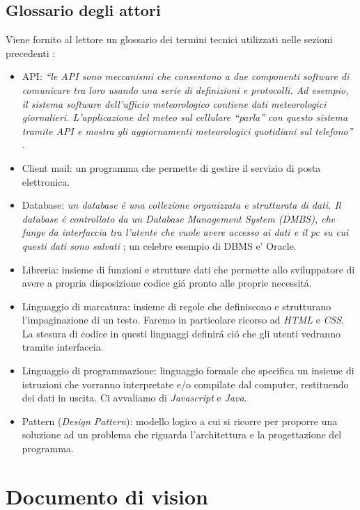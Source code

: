 \documentclass[12pt]{article}
\begin{document}
\subsection{Glossario degli attori}

Viene fornito al lettore un glossario dei termini tecnici utilizzati nelle sezioni precedenti \cite{elicitation_tools}:
\begin{itemize}
    \item API: \textit{``le API sono meccanismi che consentono a due componenti software di comunicare tra loro usando una serie di definizioni e protocolli. Ad esempio, il sistema software dell'ufficio meteorologico contiene dati meteorologici giornalieri. L'applicazione del meteo sul cellulare ``parla'' con questo sistema tramite API e mostra gli aggiornamenti meteorologici quotidiani sul telefono''} \cite{bworld}.
    \item Client mail: un programma che permette di gestire il servizio di posta elettronica.
    \item Database: \textit{un database \'e una collezione organizzata e strutturata di dati. Il database \'e controllato da un Database Management System (DMBS), che funge da interfaccia tra l'utente che vuole avere accesso ai dati e il pc su cui questi dati sono salvati} \cite{database}; un celebre esempio di DBMS e' Oracle. 
    \item Libreria: insieme di funzioni e strutture dati che permette allo sviluppatore di avere a propria disposizione codice gi\'a pronto alle proprie necessit\'a.
    \item Linguaggio di marcatura: insieme di regole che definiscono e strutturano l'impaginazione di un testo. Faremo in particolare ricorso ad \textit{HTML} e \textit{CSS}. La stesura di codice in questi linguaggi definir\'a ci\'o che gli utenti vedranno tramite interfaccia.
    \item Linguaggio di programmazione: linguaggio formale che specifica un insieme di istruzioni che vorranno interpretate e/o compilate dal computer, restituendo dei dati in uscita. Ci avvaliamo di \textit{Javascript} e \textit{Java}.
    \item Pattern (\textit{Design Pattern}): modello logico a cui si ricorre per proporre una soluzione ad un problema che riguarda l'architettura e la progettazione del programma. 
\end{itemize}


\section{Documento di vision}
\end{document}
